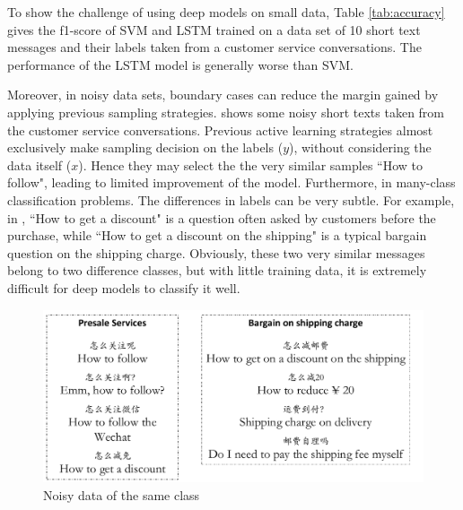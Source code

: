    
To show the challenge of using deep models on small data, 
Table \ref{tab:accuracy} gives the f1-score of SVM and LSTM trained on 
a data set of 10 short text messages and their labels 
taken from a customer service conversations. 
The performance of the LSTM model is generally worse than SVM. 
     \begin{table}[th]
     \small
    \centering
    \caption{accuracy on different classes with training set size 10}
    \label{tab:accuracy}
    \end{table}
     
Moreover, in noisy data sets, boundary cases can reduce the 
margin gained by applying previous sampling strategies. 
 shows some noisy short texts taken from 
the customer service conversations. 
Previous active learning strategies almost exclusively make sampling decision
on the labels ($y$), without considering the data itself ($x$). 
Hence they may select the the very similar samples ``How to follow", 
leading to limited improvement of the model. 
Furthermore, in many-class classification problems. The differences in
labels can be very subtle. For example, in , 
``How to get a discount" is a question often asked by customers 
before the purchase, while ``How to get a discount on the shipping" 
is a typical bargain question on the shipping charge. Obviously, 
these two very similar messages belong to two difference classes, 
but with little training data, it is extremely difficult for deep models 
to classify it well.

    \begin{figure}[th]
    \begin{center}
    \includegraphics[scale=0.3]{noise.pdf}
    \caption{Noisy data of the same class}
    \label{fig:noise}
    \end{center}
    \end{figure}
     
